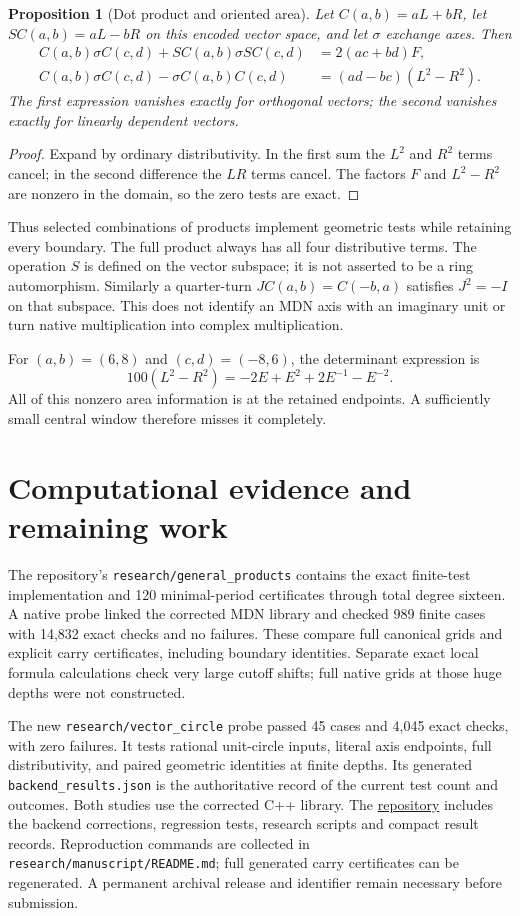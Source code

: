 \documentclass[11pt]{article}
\newtheorem{proposition}[theorem]{Proposition}
\begin{document}
\begin{proposition}[Dot product and oriented area]
Let $C(a,b)=aL+bR$, let $S C(a,b)=aL-bR$ on this encoded vector space,
and let $\sigma$ exchange axes. Then
\begin{align*}
 C(a,b)\sigma C(c,d)+S C(a,b)\sigma S C(c,d)
   &=2(ac+bd)F,\\
 C(a,b)\sigma C(c,d)-\sigma C(a,b)C(c,d)
   &=(ad-bc)(L^2-R^2).
\end{align*}
The first expression vanishes exactly for orthogonal vectors; the second
vanishes exactly for linearly dependent vectors.
\end{proposition}
\begin{proof}
Expand by ordinary distributivity. In the first sum the $L^2$ and $R^2$
terms cancel; in the second difference the $LR$ terms cancel. The factors
$F$ and $L^2-R^2$ are nonzero in the domain, so the zero tests are exact.
\end{proof}

Thus selected combinations of products implement geometric tests while
retaining every boundary. The full product always has all four
distributive terms. The operation $S$ is defined on the vector subspace;
it is not asserted to be a ring automorphism. Similarly a quarter-turn
$J C(a,b)=C(-b,a)$ satisfies $J^2=-I$ on that subspace. This does not
identify an MDN axis with an imaginary unit or turn native multiplication
into complex multiplication.

For $(a,b)=(6,8)$ and $(c,d)=(-8,6)$, the determinant expression is
\[
100(L^2-R^2)=-2E+E^2+2E^{-1}-E^{-2}.
\]
All of this nonzero area information is at the retained endpoints.
A sufficiently small central window therefore misses it completely.

\section{Computational evidence and remaining work}
The repository's \texttt{research/general\_products} contains the exact
finite-test implementation and 120 minimal-period certificates through
total degree sixteen. A native probe linked the corrected MDN library and
checked 989 finite cases with 14,832 exact checks and no failures.
These compare full canonical grids and explicit carry certificates,
including boundary identities. Separate exact local formula calculations
check very large cutoff shifts; full native grids at those huge depths
were not constructed.

The new \texttt{research/vector\_circle} probe passed 45 cases and 4,045
exact checks, with zero failures. It tests rational unit-circle
inputs, literal axis endpoints, full distributivity, and paired geometric
identities at finite depths. Its generated \texttt{backend\_results.json}
is the authoritative record of the current test count and outcomes.
Both studies use the corrected C++ library. The
\href{https://github.com/Marupio/mdn-research}{repository} includes the
backend corrections, regression tests, research scripts and compact result
records. Reproduction commands are collected in
\texttt{research/manuscript/README.md}; full generated carry certificates
can be regenerated. A permanent archival release and identifier remain
necessary before submission.
\end{document}
